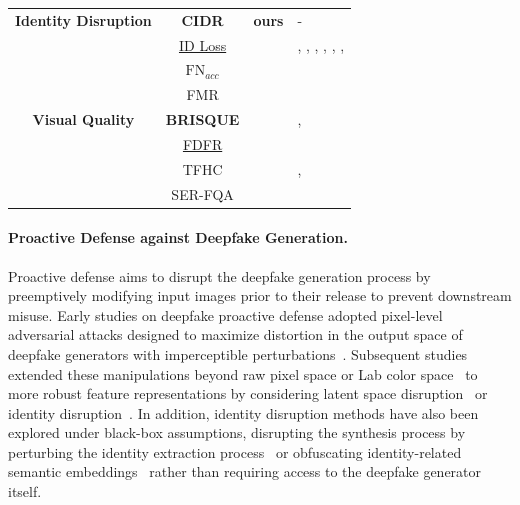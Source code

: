 \documentclass{article}
\begin{document}
\begin{table}[t!]
\begin{tabular}{c c c p{9.5cm}}
        \multirow{1}{*}{\textbf{Identity Disruption}}
        & \textbf{CIDR} & \textbf{ours} & - \\
          & \underline{ID Loss} & \cite{deng2019arcface} & \cite{van2023anti}, \cite{qu2024df}, \cite{qu2025id} , \cite{jeong2025faceshield}, \cite{shim2025leat}, \cite{wang2025nullswap}, \cite{lee2025scol} \\
          & $\text{FN}_{acc}$ & \cite{zhang2024dual} & \cite{zhang2024dual} \\
          & FMR & \cite{wang2025faceswapguard} & \cite{wang2025faceswapguard} \\
         
        \cmidrule(lr){1-4}

        \multirow{1}{*}{\textbf{Visual Quality}}
         & \textbf{BRISQUE} & \cite{mittal2012no} & \cite{dong2023restricted}, \cite{van2023anti} \\
         & \underline{FDFR} & \cite{van2023anti} & \cite{van2023anti} \\
         & TFHC & \cite{hyperfas2020} & \cite{huang2022cmua}, \cite{tang2024feature} \\
         & SER-FQA & \cite{terhorst2020ser} & \cite{van2023anti} \\

        \bottomrule
    \end{tabular}
\end{table}

\paragraph{Proactive Defense against Deepfake Generation.}
\label{subsec:proactive}
Proactive defense aims to disrupt the deepfake generation process by preemptively modifying input images prior to their release to prevent downstream misuse. %
Early studies on deepfake proactive defense adopted pixel-level adversarial attacks designed to maximize distortion in the output space of deepfake generators with imperceptible perturbations~\cite{ruiz2020disrupting, aneja2022tafim, huang2022cmua}. Subsequent studies extended these manipulations beyond raw pixel space or Lab color space~\cite{wang2022anti} to more robust feature representations by considering latent space disruption~\cite{shim2025leat} or identity disruption~\cite{lee2025scol}. In addition, identity disruption methods have also been explored under black-box assumptions, disrupting the synthesis process by perturbing the identity extraction process~\cite{wang2025nullswap} or obfuscating identity-related semantic embeddings~\cite{wang2025faceswapguard} rather than requiring access to the deepfake generator itself. 
\end{document}
